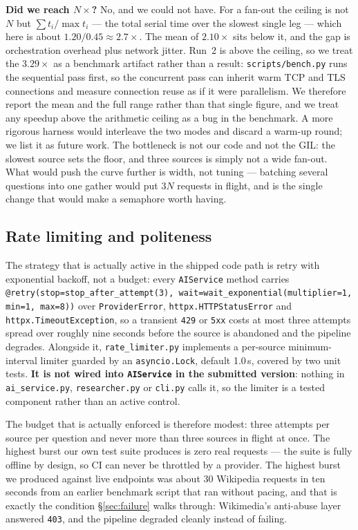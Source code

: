 \documentclass[11pt,a4paper]{article}
\begin{document}
\textbf{Did we reach $N\times$?} No, and we could not have. For a fan-out the ceiling is not $N$
but $\sum t_i / \max t_i$ --- the total serial time over the slowest single leg --- which here is
about $1.20 / 0.45 \approx 2.7\times$. The mean of $2.10\times$ sits below it, and the gap is
orchestration overhead plus network jitter. Run~2 is above the ceiling, so we treat the
$3.29\times$ as a benchmark artifact rather than a result: \texttt{scripts/bench.py} runs the
sequential pass first, so the concurrent pass can inherit warm TCP and TLS connections and
measure connection reuse as if it were parallelism. We therefore report the mean and the full
range rather than that single figure, and we treat any speedup above the arithmetic ceiling as a
bug in the benchmark. A more rigorous harness would interleave the two modes and discard a
warm-up round; we list it as future work. The bottleneck is not our code and not the GIL: the
slowest source sets the floor, and three sources is simply not a wide fan-out. What would push
the curve further is width, not tuning --- batching several questions into one gather would put
$3N$ requests in flight, and is the single change that would make a semaphore worth having.

\subsection{Rate limiting and politeness}

The strategy that is actually active in the shipped code path is retry with exponential backoff,
not a budget: every \texttt{AIService} method carries
\texttt{@retry(stop=stop\_after\_attempt(3), wait=wait\_exponential(multiplier=1, min=1, max=8))}
over \texttt{ProviderError}, \texttt{httpx.HTTPStatusError} and \texttt{httpx.TimeoutException},
so a transient \texttt{429} or \texttt{5xx} costs at most three attempts spread over
roughly nine seconds before the source is abandoned and the pipeline degrades. Alongside it,
\texttt{rate\_limiter.py} implements a per-source minimum-interval limiter guarded by an
\texttt{asyncio.Lock}, default 1.0\,s, covered by two unit tests. \textbf{It is not wired into
\texttt{AIService} in the submitted version}: nothing in \texttt{ai\_service.py},
\texttt{researcher.py} or \texttt{cli.py} calls it, so the limiter is a tested component rather
than an active control.

The budget that is actually enforced is therefore modest: three attempts per source per question
and never more than three sources in flight at once. The highest burst our own test suite produces is zero real
requests --- the suite is fully offline by design, so CI can never be throttled by a provider.
The highest burst we produced against live endpoints was about 30 Wikipedia requests in ten
seconds from an earlier benchmark script that ran without pacing, and that is exactly the condition
\S\ref{sec:failure} walks through: Wikimedia's anti-abuse layer answered \texttt{403}, and the
pipeline degraded cleanly instead of failing.
\end{document}
